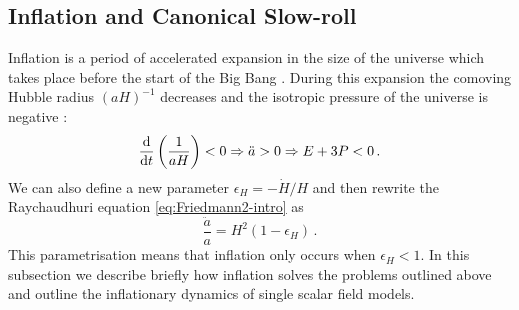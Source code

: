 \subsection{Inflation and Canonical Slow-roll}
\label{sec:slowroll-intro}

Inflation is a period of accelerated expansion in the size of the universe
which takes place before the start of the Big Bang
\cite{Starobinsky:1980te,Guth:1980zm,Albrecht:1982wi,Linde:1981mu,
Starobinsky:1982ee}. During this
expansion the comoving Hubble radius $(aH)^{-1}$ decreases and the isotropic
pressure of the universe is negative \cite{book:liddle, Baumann2009}:
\begin{equation}
\label{eq:infldefn-intro}
 \frac{\mathrm{d} }{\mathrm{d} t}\left( \frac{1}{aH}\right) <0 \Rightarrow \ddot{a}>0
  \Rightarrow E + 3P < 0 \,.
\end{equation}
We can also define a new parameter $\epsilon_H = -\dot{H}/H$ and then rewrite
the Raychaudhuri equation \eqref{eq:Friedmann2-intro} as
% 
\begin{equation}
 \label{eq:Friedeps-intro}
 \frac{\ddot{a}}{a} = H^2 (1-\epsilon_H)\,.
\end{equation}
% 
This parametrisation means that inflation only occurs when $\epsilon_H<1$.
In this subsection we describe briefly how inflation solves the problems
outlined above and outline the inflationary dynamics of single scalar field
models. 

